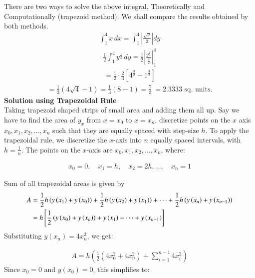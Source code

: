 \documentclass[journal]{IEEEtran}
\begin{document}
There are two ways to solve the above integral, Theoretically and Computationally (trapezoid method). We shall compare the results obtained by both methods.
\begin{align}
    \int_1^4 x \, dx = \int_1^4 \left| \frac{\sqrt{y}}{2} \right| dy
\end{align}
\begin{align}
    \frac{1}{2} \int_1^4 y^{\frac{1}{2}} \, dy = \frac{1}{2} \left| \frac{y^{\frac{3}{2}}}{\frac{3}{2}} \right|_1^4
\end{align}
\begin{align}
    = \frac{1}{2} \cdot \frac{2}{3} \left[ 4^{\frac{3}{2}} - 1^{\frac{3}{2}} \right]
\end{align}
\begin{align}
    = \frac{1}{3} \left( 4\sqrt{4} - 1 \right) = \frac{1}{3} (8 - 1) = \frac{7}{3} \ = 2.3333 \text{ sq. units.} 
\end{align}
\textbf{Solution using Trapezoidal Rule}\\
Taking trapezoid shaped strips of small area and adding them all up. Say we have to find the area of $y_{x}$ from $x=x_0$ to $x=x_n$, discretize points on the $x$ axis $x_0, x_1, x_2, \dots, x_n$ such that they are equally spaced with step-size $h$. \newline
To apply the trapezoidal rule, we discretize the \( x \)-axis into \( n \) equally spaced intervals, with \( h = \frac{1}{n} \). The points on the \( x \)-axis are \( x_0, x_1, x_2, \dots, x_n \), where:

\begin{align}
x_0 = 0, \quad x_1 = h, \quad x_2 = 2h, \dots, \quad x_n = 1    
\end{align}

Sum of all trapezoidal areas is given by
\begin{align}
  A&=\frac{1}{2}h\left(y\left(x_1\right)+y\left(x_0\right)\right)+ \frac{1}{2}h\left(y\left(x_2\right)+y\left(x_1\right)\right)+\dots+\frac{1}{2}h\left(y\left(x_n\right)+y\left(x_{n-1}\right)\right)\\
  &=h{}\left[\frac{1}{2}\left(y\left(x_0\right)+y\left(x_n\right)\right)+ y\left(x_1\right)+\dots+y\left(x_{n-1}\right)\right]
\end{align}
Substituting \( y(x_n) = 4x_n^2 \), we get:

\begin{align}
    A = h \left( \frac{1}{2} \left( 4x_0^2 + 4x_n^2 \right) + \sum_{i=1}^{n-1} 4x_i^2 \right)
\end{align}
Since \( x_0 = 0 \) and \( y(x_0) = 0 \), this simplifies to:
\end{document}
